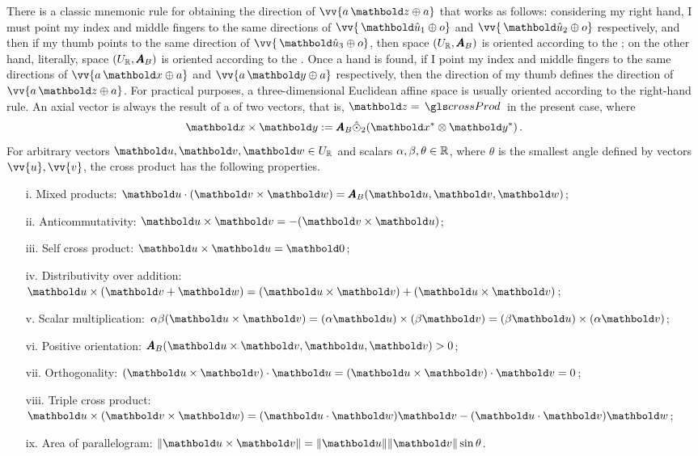 There is a classic mnemonic rule for obtaining the direction of $\vv{a\,\vto{z}\oplus a}$ that works as follows: considering my right hand, I must point my index and middle fingers to the same directions of $\vv{\,\vun{u}_1\oplus o}$ and $\vv{\,\vun{u}_2\oplus o}$ respectively, and then if my thumb points to the same direction of $\vv{\,\vun{u}_3\oplus o}$, then space $(U_{\mathbb{R}},\pmb{A}_B)$ is oriented according to the ; on the other hand, literally, space $(U_{\mathbb{R}},\pmb{A}_B)$ is oriented according to the . Once a hand is found, if I point my index and middle fingers to the same directions of $\vv{a\,\vto{x}\oplus a}$ and $\vv{a\,\vto{y}\oplus a}$ respectively, then the direction of my thumb defines the direction of $\vv{a\,\vto{z}\oplus a}$. For practical purposes, a three-dimensional Euclidean affine space is usually oriented according to the right-hand rule. An axial vector is always the result of a  of two vectors, that is, $\vto{z}=\gloref{crossProd}$ in the present case, where
\begin{equation}\label{eq:crossProduct}
\vto{x}\times\vto{y} := \tnr{A}_B\hat{\odot}_2 (\vto{x}^*\otimes\vto{y}^*)\,.
\end{equation}
For arbitrary vectors $\vto{u},\vto{v},\vto{w}\in U_\real$ and scalars $\alpha,\beta,\theta\in\mathbb{R}$, where $\theta$ is the smallest angle defined by vectors $\vv{u},\vv{v}$, the cross product has the following properties.
\begin{itemize}
	\setlength\itemsep{.1em}
	\item[i.] Mixed products: $\vto{u}\cdot(\vto{v}\times\vto{w})=\fua{\tnr{A}_B}{\vto{u},\vto{v},\vto{w}}$;
	\item[ii.] Anticommutativity: $\vto{u}\times\vto{v}=-(\vto{v}\times\vto{u})$;
	\item[iii.] Self cross product: $\vto{u}\times\vto{u}=\vto{0}$;
	\item[iv.] Distributivity over addition: $\vto{u}\times(\vto{v}+\vto{w})=(\vto{u}\times\vto{v})+(\vto{u}\times\vto{v})$;
	\item[v.] Scalar multiplication: $\alpha\beta(\vto{u}\times\vto{v})=(\alpha\vto{u})\times(\beta\vto{v})=(\beta\vto{u})\times(\alpha\vto{v})$;
	\item[vi.] Positive orientation: $\tnr{A}_B(\vto{u}\times\vto{v},\vto{u},\vto{v})>0$;
	\item[vii.] Orthogonality: $(\vto{u}\times\vto{v})\cdot\vto{u}=(\vto{u}\times\vto{v})\cdot\vto{v}=0$;
	\item[viii.] Triple cross product: $\vto{u}\times(\vto{v}\times\vto{w})=(\vto{u}\cdot\vto{w})\vto{v}-(\vto{u}\cdot\vto{v})\vto{w}$;
	\item[ix.] Area of parallelogram: $\|\vto{u}\times\vto{v}\|= \|\vto{u} \|\|\vto{v} \|\sin\theta$.
\end{itemize}

